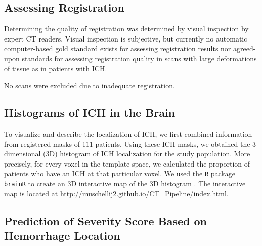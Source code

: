 \documentclass[10pt]{article}\usepackage[]{graphicx}\usepackage[]{color}
\begin{document}
\subsection{Assessing Registration}

Determining the quality of registration was determined by visual inspection by expert CT readers.  Visual inspection is subjective, but currently no automatic computer-based gold standard exists for assessing registration results nor agreed-upon standards for assessing registration quality in scans with large deformations of tissue as in patients with ICH.  

No scans were excluded due to inadequate registration.





\subsection{Histograms of ICH in the Brain}

To visualize and describe the localization of ICH, we first combined information from registered masks of 111 patients.  Using these ICH masks, we obtained the $3$-dimensional (3D) histogram of ICH localization for the study population. More precisely, for every voxel in the template space, we calculated the proportion of patients who have an ICH at that particular voxel.  
We used the \verb|R| package \verb|brainR| to create an 3D interactive map of the 3D histogram \citep{brainr}.  The interactive map is located at \url{http://muschellij2.github.io/CT_Pipeline/index.html}.  


\subsection{Prediction of Severity Score Based on Hemorrhage Location}


\end{document}
